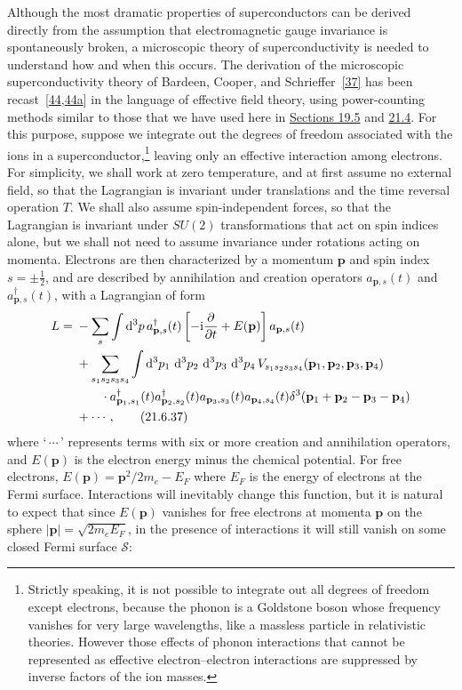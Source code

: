 Although the most dramatic properties of superconductors can be derived directly from the assumption that electromagnetic gauge invariance is spontaneously broken, a microscopic theory of superconductivity is needed to understand how and when this occurs. The derivation of the microscopic superconductivity theory of Bardeen, Cooper, and Schrieffer~\hyperref[ch21-ref-37]{[37]} has been recast~[\hyperref[ch21-ref-44]{44},\hyperref[ch21-ref-44a]{44a}] in the language of effective field theory, using power-counting methods similar to those that we have used here in \hyperref[sec:19.5]{Sections 19.5} and \hyperref[sec:21.4]{21.4}. For this purpose, suppose we integrate out the degrees of freedom associated with the ions in a superconductor,\footnote{Strictly speaking, it is not possible to integrate out all degrees of freedom except electrons, because the phonon is a Goldstone boson whose frequency vanishes for very large wavelengths, like a massless particle in relativistic theories. However those effects of phonon interactions that cannot be represented as effective electron--electron interactions are suppressed by inverse factors of the ion masses.} leaving only an effective interaction among electrons. For simplicity, we shall work at zero temperature, and at first assume no external field, so that the Lagrangian is invariant under translations and the time reversal operation $T$. We shall also assume spin-independent forces, so that the Lagrangian is invariant under $SU(2)$ transformations that act on spin indices alone, but we shall not need to assume invariance under rotations acting on momenta. Electrons are then characterized by a momentum $\mathbf p$ and spin index $s=\pm\frac12$, and are described by annihilation and creation operators $a_{\mathbf p,s}(t)$ and $a^\dagger_{\mathbf p,s}(t)$, with a Lagrangian of form
\begin{align}
L={}&-\sum_s\int \mathop{}\!\mathrm{d}^3p\,
a^\dagger_{\mathbf p,s}(t)
\left[-\mathrm{i}\frac{\partial}{\partial t}+E(\mathbf p)\right]
a_{\mathbf p,s}(t)
\notag\\
&+\sum_{s_1s_2s_3s_4}
\int \mathop{}\!\mathrm{d}^3p_1\,\mathop{}\!\mathrm{d}^3p_2\,\mathop{}\!\mathrm{d}^3p_3\,\mathop{}\!\mathrm{d}^3p_4\,
V_{s_1s_2s_3s_4}
(\mathbf p_1,\mathbf p_2,\mathbf p_3,\mathbf p_4)
\notag\\
&\qquad\cdot
a^\dagger_{\mathbf p_1,s_1}(t)
a^\dagger_{\mathbf p_2,s_2}(t)
a_{\mathbf p_3,s_3}(t)
a_{\mathbf p_4,s_4}(t)
\delta^3(\mathbf p_1+\mathbf p_2-\mathbf p_3-\mathbf p_4)
\notag\\
&+\cdots,
\tag{21.6.37}\label{eq:21.6.37}
\end{align}
where `$\,\cdots\,$' represents terms with six or more creation and annihilation operators, and $E(\mathbf p)$ is the electron energy minus the chemical potential. For free electrons, $E(\mathbf p)=\mathbf p^2/2m_e-E_F$ where $E_F$ is the energy of electrons at the Fermi surface. Interactions will inevitably change this function, but it is natural to expect that since $E(\mathbf p)$ vanishes for free electrons at momenta $\mathbf p$ on the sphere $|\mathbf p|=\sqrt{2m_eE_F}$, in the presence of interactions it will still vanish on some closed Fermi surface $\mathcal S$:
